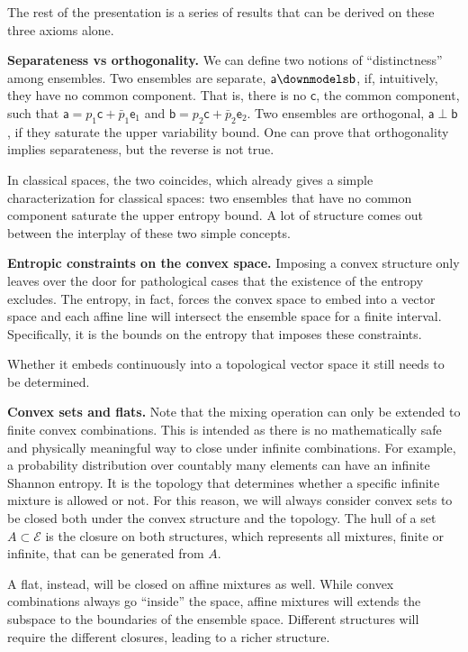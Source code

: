 \documentclass[10pt,twocolumn, nofootinbib]{revtex4-2}
\newcommand{\ens}[1][e] {\mathsf{#1}} %
\newcommand{\Ens}[1][E] {\mathcal{#1}} %
\newcommand\hull{\mathrm{hull}}
\def\separate{\downmodels}
\def\ortho{\perp}
\begin{document}
The rest of the presentation is a series of results that can be derived on these three axioms alone.

\textbf{Separateness vs orthogonality.} We can define two notions of ``distinctness'' among ensembles. Two ensembles are separate, $\ens[a] \separate \ens[b]$, if, intuitively, they have no common component. That is, there is no $\ens[c]$, the common component, such that $\ens[a] = p_1 \ens[c] + \bar{p}_1 \ens_1$ and $\ens[b] = p_2 \ens[c] + \bar{p}_2 \ens_2$. Two ensembles are orthogonal, $\ens[a] \ortho \ens[b]$, if they saturate the upper variability bound. One can prove that orthogonality implies separateness, but the reverse is not true.

In classical spaces, the two coincides, which already gives a simple characterization for classical spaces: two ensembles that have no common component saturate the upper entropy bound. A lot of structure comes out between the interplay of these two simple concepts.

\textbf{Entropic constraints on the convex space.} Imposing a convex structure only leaves over the door for pathological cases that the existence of the entropy excludes. The entropy, in fact, forces the convex space to embed into a vector space and each affine line will intersect the ensemble space for a finite interval. Specifically, it is the bounds on the entropy that imposes these constraints.

Whether it embeds continuously into a topological vector space it still needs to be determined.

\textbf{Convex sets and flats.} Note that the mixing operation can only be extended to finite convex combinations. This is intended as there is no mathematically safe and physically meaningful way to close under infinite combinations. For example, a probability distribution over countably many elements can have an infinite Shannon entropy. It is the topology that determines whether a specific infinite mixture is allowed or not. For this reason, we will always consider convex sets to be closed both under the convex structure and the topology. The $\hull$ of a set $A \subset \Ens$ is the closure on both structures, which represents all mixtures, finite or infinite, that can be generated from $A$.

A flat, instead, will be closed on affine mixtures as well. While convex combinations always go ``inside'' the space, affine mixtures will extends the subspace to the boundaries of the ensemble space. Different structures will require the different closures, leading to a richer structure.
\end{document}
